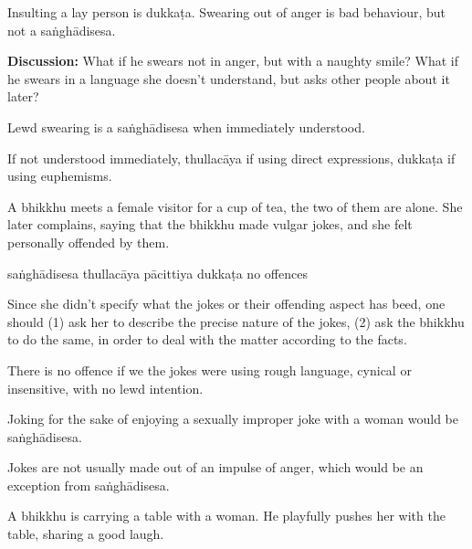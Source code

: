 \begin{exam}{\autoExamName}
\begin{problem*}
\begin{parts}
    \begin{solution}
      Insulting a lay person is dukkaṭa.
      Swearing out of anger is bad behaviour, but not a saṅghādisesa.
    \end{solution}

    \bigskip

    \textbf{Discussion:} What if he swears not in anger, but with a naughty
    smile? What if he swears in a language she doesn't understand, but asks
    other people about it later?

    \begin{solution}
      Lewd swearing is a saṅghādisesa when immediately understood.

      If not understood immediately, thullacāya if using direct expressions, dukkaṭa if using euphemisms.
    \end{solution}

    \bigskip

  \item A bhikkhu meets a female visitor for a cup of tea, the two of them are alone.
  She later complains, saying that the bhikkhu made vulgar jokes,
  and she felt personally offended by them.

    \bigskip

    \begin{answers}{5}
      \bChoices
       saṅghādisesa\eAns
       thullacāya\eAns
       pācittiya\eAns
       dukkaṭa\eAns
       no offences\eAns
      \eChoices
    \end{answers}

    \begin{solution}
      Since she didn't specify what the jokes or their offending aspect has beed,
      one should (1) ask her to describe the precise nature of the jokes,
      (2) ask the bhikkhu to do the same,
      in order to deal with the matter according to the facts.

      There is no offence if we the jokes were using
      rough language, cynical or insensitive, with no lewd intention.

      Joking for the sake of enjoying a sexually improper joke with a woman would be saṅghādisesa.

      Jokes are not usually made out of an impulse of anger, which would be an exception from saṅghādisesa.
    \end{solution}

    \bigskip

  \item A bhikkhu is carrying a table with a woman. He playfully pushes her
    with the table, sharing a good laugh.


\end{parts}
\end{problem*}
\end{exam}

